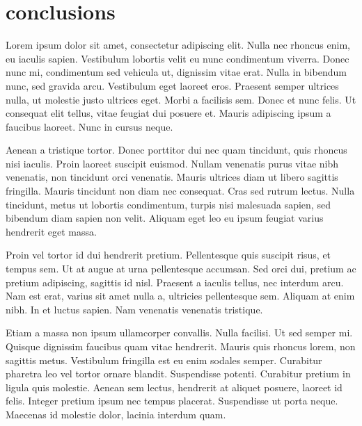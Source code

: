 \documentclass[final,5p,times,twocolumn]{elsarticle}
\begin{document}
\section{conclusions}
\label{conclusions}

Lorem ipsum dolor sit amet, consectetur adipiscing elit. Nulla nec rhoncus
enim, eu iaculis sapien. Vestibulum lobortis velit eu nunc condimentum viverra.
Donec nunc mi, condimentum sed vehicula ut, dignissim vitae erat. Nulla in
bibendum nunc, sed gravida arcu. Vestibulum eget laoreet eros. Praesent semper
ultrices nulla, ut molestie justo ultrices eget. Morbi a facilisis sem. Donec
et nunc felis. Ut consequat elit tellus, vitae feugiat dui posuere et. Mauris
adipiscing ipsum a faucibus laoreet. Nunc in cursus neque.

Aenean a tristique tortor. Donec porttitor dui nec quam tincidunt, quis rhoncus
nisi iaculis. Proin laoreet suscipit euismod. Nullam venenatis purus vitae nibh
venenatis, non tincidunt orci venenatis. Mauris ultrices diam ut libero
sagittis fringilla. Mauris tincidunt non diam nec consequat. Cras sed rutrum
lectus. Nulla tincidunt, metus ut lobortis condimentum, turpis nisi malesuada
sapien, sed bibendum diam sapien non velit. Aliquam eget leo eu ipsum feugiat
varius hendrerit eget massa.

Proin vel tortor id dui hendrerit pretium. Pellentesque quis suscipit risus, et
tempus sem. Ut at augue at urna pellentesque accumsan. Sed orci dui, pretium ac
pretium adipiscing, sagittis id nisl. Praesent a iaculis tellus, nec interdum
arcu. Nam est erat, varius sit amet nulla a, ultricies pellentesque sem.
Aliquam at enim nibh. In et luctus sapien. Nam venenatis venenatis tristique.

Etiam a massa non ipsum ullamcorper convallis. Nulla facilisi. Ut sed semper
mi. Quisque dignissim faucibus quam vitae hendrerit. Mauris quis rhoncus lorem,
non sagittis metus. Vestibulum fringilla est eu enim sodales semper. Curabitur
pharetra leo vel tortor ornare blandit. Suspendisse potenti. Curabitur pretium
in ligula quis molestie. Aenean sem lectus, hendrerit at aliquet posuere,
laoreet id felis. Integer pretium ipsum nec tempus placerat. Suspendisse ut
porta neque. Maecenas id molestie dolor, lacinia interdum quam.


\end{document}
